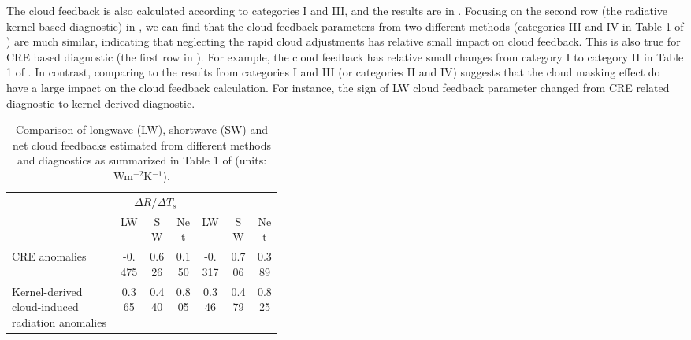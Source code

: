 The cloud feedback is also calculated according to categories I and III, and the results are in . Focusing on the second row (the radiative kernel based diagnostic) in , we can find that the cloud feedback parameters from two different methods (categories III and IV in Table 1 of \citealt{Zelinka2013}) are much similar, indicating that neglecting the rapid cloud adjustments has relative small impact on cloud feedback. This is also true for CRE based diagnostic (the first row in ). For example, the cloud feedback has relative small changes from category I to category II in Table 1 of \cite{Zelinka2013}. In contrast, comparing to the results from categories I and III (or categories II and IV) suggests that the cloud masking effect do have a large impact on the cloud feedback calculation. For instance, the sign of LW cloud feedback parameter changed from CRE related diagnostic to kernel-derived diagnostic.

\begin{table}[ht]
	\caption{Comparison of longwave (LW), shortwave (SW) and net cloud feedbacks estimated from different methods and diagnostics as summarized in Table 1 of \cite{Zelinka2013} (units: Wm$^{-2}$K$^{-1}$).}
	\vspace{0.5em}
	\centering
	\renewcommand{\arraystretch}{1.2}
	\begin{tabular}{>{\centering}m{0.4\linewidth} ccc ccc} 
		\toprule
		 &  & \\
		 & LW & SW & Net & LW & SW & Net \\
		\midrule
		CRE anomalies   &  -0.475 &   0.626 &    0.150 &    -0.317 &     0.706 &      0.389 \\  
        Kernel-derived cloud-induced radiation anomalies &   0.365 &   0.440 &    0.805 &     0.346 &     0.479 &      0.825 \\  
        \bottomrule
	\end{tabular}
	\label{tab:four_methods_cldfbk_results}
\end{table}


